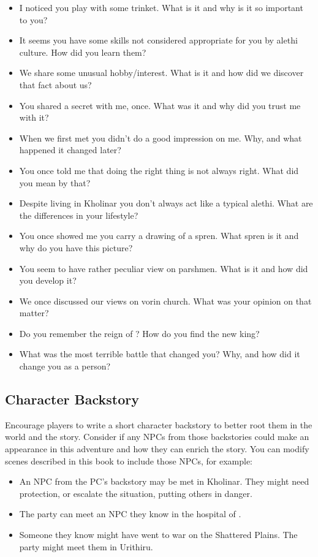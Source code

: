 \begin{itemize}
	\item I noticed you play with some trinket. What is it and why is it so important to you?
	\item It seems you have some skills not considered appropriate for you by alethi culture. How did you learn them?
	\item We share some unusual hobby/interest. What is it and how did we discover that fact about us?
	\item You shared a secret with me, once. What was it and why did you trust me with it?
	\item When we first met you didn't do a good impression on me. Why, and what happened it changed later?
	\item You once told me that doing the right thing is not always right. What did you mean by that?
	\item Despite living in Kholinar you don't always act like a typical alethi. What are the differences in your lifestyle?
	\item You once showed me you carry a drawing of a spren. What spren is it and why do you have this picture?
	\item You seem to have rather peculiar view on parshmen. What is it and how did you develop it?
	\item We once discussed our views on vorin church. What was your opinion on that matter?
	\item Do you remember the reign of \npcDeadKing{}? How do you find the new king?
	\item What was the most terrible battle that changed you? Why, and how did it change you as a person?
\end{itemize}

\newpage
\subsection{Character Backstory}

Encourage players to write a short character backstory to better root them in the world and the story. Consider if any NPCs from those backstories could make an appearance in this adventure and how they can enrich the story. You can modify scenes described in this book to include those NPCs, for example:
\begin{itemize}
	\item An NPC from the PC's backstory may be met in Kholinar. They might need protection, or escalate the situation, putting others in danger.
	
	\item The party can meet an NPC they know in the hospital of \npcTaravangian{}.
	
	\item Someone they know might have went to war on the Shattered Plains. The party might meet them in Urithiru.
\end{itemize}

